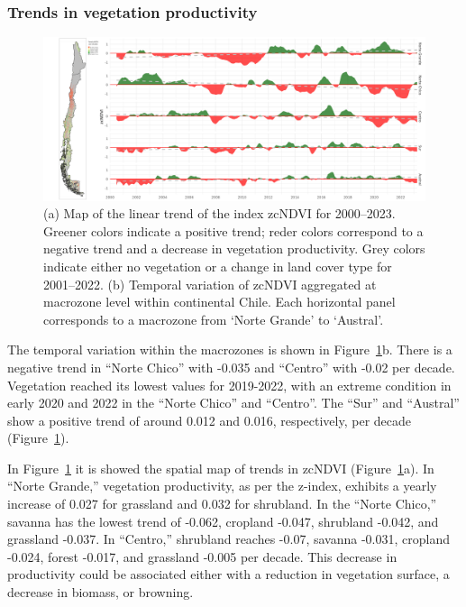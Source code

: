 \documentclass[
  authoryear,
  preprint,
  3p,
  onecolumn]{elsarticle}
\begin{document}
\hypertarget{trends-in-vegetation-productivity}{%
\subsubsection{Trends in vegetation
productivity}\label{trends-in-vegetation-productivity}}

\begin{figure}[!ht]

{\centering \includegraphics{../output/figs/temporal_variation_zcNDVI6_macrozonas_con_mapa.png}

}

\caption{\label{fig-zcNDVI_var}(a) Map of the linear trend of the index
zcNDVI for 2000--2023. Greener colors indicate a positive trend; reder
colors correspond to a negative trend and a decrease in vegetation
productivity. Grey colors indicate either no vegetation or a change in
land cover type for 2001--2022. (b) Temporal variation of zcNDVI
aggregated at macrozone level within continental Chile. Each horizontal
panel corresponds to a macrozone from `Norte Grande' to `Austral'.}

\end{figure}

The temporal variation within the macrozones is shown in
Figure~\ref{fig-zcNDVI_var}b. There is a negative trend in ``Norte
Chico'' with -0.035 and ``Centro'' with -0.02 per decade. Vegetation
reached its lowest values for 2019-2022, with an extreme condition in
early 2020 and 2022 in the ``Norte Chico'' and ``Centro''. The ``Sur''
and ``Austral'' show a positive trend of around 0.012 and 0.016,
respectively, per decade (Figure~\ref{fig-zcNDVI_var}).

In Figure~\ref{fig-zcNDVI_var} it is showed the spatial map of trends in
zcNDVI (Figure~\ref{fig-zcNDVI_var}a). In ``Norte Grande,'' vegetation
productivity, as per the z-index, exhibits a yearly increase of 0.027
for grassland and 0.032 for shrubland. In the ``Norte Chico,'' savanna
has the lowest trend of -0.062, cropland -0.047, shrubland -0.042, and
grassland -0.037. In ``Centro,'' shrubland reaches -0.07, savanna
-0.031, cropland -0.024, forest -0.017, and grassland -0.005 per decade.
This decrease in productivity could be associated either with a
reduction in vegetation surface, a decrease in biomass, or browning.
\end{document}
